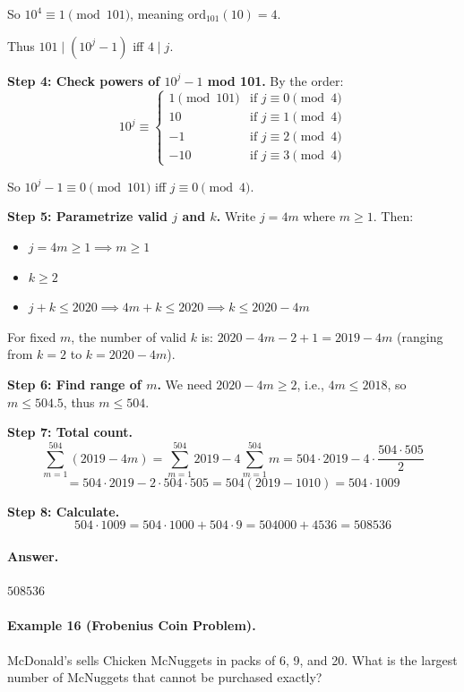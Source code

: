 \documentclass[12pt]{extarticle}
\begin{document}
So $10^4 \equiv 1 \pmod{101}$, meaning $\text{ord}_{101}(10) = 4$.

Thus $101 \mid (10^j - 1)$ iff $4 \mid j$.

\textbf{Step 4: Check powers of $10^j - 1$ mod 101.} By the order:
\[
10^j \equiv \begin{cases} 1 \pmod{101} & \text{if } j \equiv 0 \pmod{4} \\ 10 & \text{if } j \equiv 1 \pmod{4} \\ -1 & \text{if } j \equiv 2 \pmod{4} \\ -10 & \text{if } j \equiv 3 \pmod{4} \end{cases}
\]

So $10^j - 1 \equiv 0 \pmod{101}$ iff $j \equiv 0 \pmod{4}$.

\textbf{Step 5: Parametrize valid $j$ and $k$.} Write $j = 4m$ where $m \ge 1$. Then:
\begin{itemize}
    \item $j = 4m \ge 1 \implies m \ge 1$
    \item $k \ge 2$
    \item $j + k \le 2020 \implies 4m + k \le 2020 \implies k \le 2020 - 4m$
\end{itemize}

For fixed $m$, the number of valid $k$ is: $2020 - 4m - 2 + 1 = 2019 - 4m$ (ranging from $k = 2$ to $k = 2020 - 4m$).

\textbf{Step 6: Find range of $m$.} We need $2020 - 4m \ge 2$, i.e., $4m \le 2018$, so $m \le 504.5$, thus $m \le 504$.

\textbf{Step 7: Total count.}
\[
\sum_{m=1}^{504} (2019 - 4m) = \sum_{m=1}^{504} 2019 - 4\sum_{m=1}^{504} m = 504 \cdot 2019 - 4 \cdot \frac{504 \cdot 505}{2}
\]
\[
= 504 \cdot 2019 - 2 \cdot 504 \cdot 505 = 504(2019 - 1010) = 504 \cdot 1009
\]

\textbf{Step 8: Calculate.}
\[
504 \cdot 1009 = 504 \cdot 1000 + 504 \cdot 9 = 504000 + 4536 = 508536
\]

\paragraph{Answer.} $\boxed{508536}$

\paragraph{Example 16 (Frobenius Coin Problem).} McDonald's sells Chicken McNuggets in packs of 6, 9, and 20. What is the largest number of McNuggets that cannot be purchased exactly?
\end{document}
